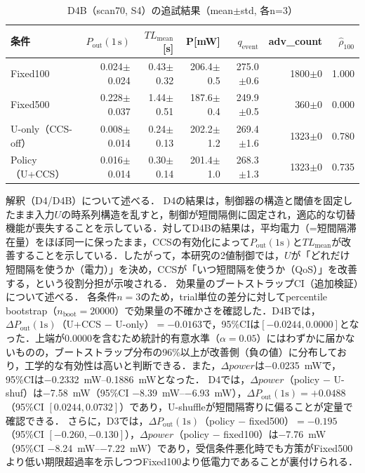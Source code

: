 \begin{table}[tb]
  \centering
  \caption{D4B（scan70, S4）の追試結果（mean$\pm$std, 各n=3）}
  \label{tab:d4b_scan70_summary}
  {\small
  \setlength{\tabcolsep}{4pt}
  \begin{tabular}{lrrrrrr}
    \toprule
    条件 & $P_{\mathrm{out}}(1\,\mathrm{s})$ & $TL_{\mathrm{mean}}$[s] & P[mW] & $q_{\mathrm{event}}$ & adv\_count & $\hat{\rho}_{100}$ \\
    \midrule
    Fixed100 & 0.024$\pm$0.024 & 0.43$\pm$0.32 & 206.4$\pm$0.5 & 275.0$\pm$0.6 & 1800$\pm$0 & 1.000 \\
    Fixed500 & 0.228$\pm$0.037 & 1.44$\pm$0.51 & 187.6$\pm$0.4 & 249.9$\pm$0.5 & 360$\pm$0 & 0.000 \\
    U-only（CCS-off） & 0.008$\pm$0.014 & 0.24$\pm$0.13 & 202.2$\pm$1.2 & 269.4$\pm$1.6 & 1323$\pm$0 & 0.780 \\
    Policy（U+CCS） & 0.016$\pm$0.014 & 0.30$\pm$0.14 & 201.4$\pm$1.0 & 268.3$\pm$1.3 & 1323$\pm$0 & 0.735 \\
    \bottomrule
  \end{tabular}
  }
\end{table}
\noindent 解釈（D4/D4B）について述べる．
D4の結果は，制御器の構造と閾値を固定したまま入力$U$の時系列構造を乱すと，制御が短間隔側に固定され，適応的な切替機能が喪失することを示している．対してD4Bの結果は，平均電力（=短間隔滞在量）をほぼ同一に保ったまま，CCSの有効化によって$P_{\mathrm{out}}(1\mathrm{s})$と$TL_{\mathrm{mean}}$が改善することを示している．したがって，本研究の2値制御では，$U$が「どれだけ短間隔を使うか（電力）」を決め，CCSが「いつ短間隔を使うか（QoS）」を改善する，という役割分担が示唆される．
\noindent 効果量のブートストラップCI（追加検証）について述べる．
各条件$n=3$のため，trial単位の差分に対してpercentile bootstrap（$n_{\mathrm{boot}}=20000$）で効果量の不確かさを確認した．D4Bでは，$\Delta P_{\mathrm{out}}(1\mathrm{s})$（U+CCS $-$ U-only）$=-0.0163$で，95\%CIは$[-0.0244, 0.0000]$となった．上端が0.0000を含むため統計的有意水準（$\alpha=0.05$）にはわずかに届かないものの，ブートストラップ分布の96\%以上が改善側（負の値）に分布しており，工学的な有効性は高いと判断できる．また，$\Delta power$は\SI{-0.0235}{\milli\watt}で，95\%CIは\SIrange{-0.2332}{0.1886}{\milli\watt}となった．
D4では，$\Delta power$（policy $-$ U-shuf）は\SI{-7.58}{\milli\watt}（95\%CI \SIrange{-8.39}{-6.93}{\milli\watt}），$\Delta P_{\mathrm{out}}(1\mathrm{s})=+0.0488$（95\%CI $[0.0244,0.0732]$）であり，U-shuffleが短間隔寄りに偏ることが定量で確認できる．
さらに，D3では，$\Delta P_{\mathrm{out}}(1\mathrm{s})$（policy $-$ fixed500）$=-0.195$（95\%CI $[-0.260,-0.130]$），$\Delta power$（policy $-$ fixed100）は\SI{-7.76}{\milli\watt}（95\%CI \SIrange{-8.24}{-7.22}{\milli\watt}）であり，受信条件悪化時でも方策がFixed500より低い期限超過率を示しつつFixed100より低電力であることが裏付けられる．

